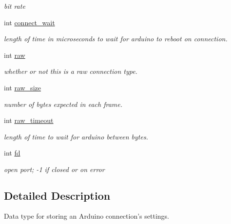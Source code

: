 \begin{DoxyCompactItemize}
\begin{DoxyCompactList}\small\item\em bit rate \end{DoxyCompactList}\item 
int \hyperlink{struct__ino__connection__s_a8735c98900da1fb30ff57141d3271743}{connect\-\_\-wait}
\begin{DoxyCompactList}\small\item\em length of time in microseconds to wait for arduino to reboot on connection. \end{DoxyCompactList}\item 
int \hyperlink{struct__ino__connection__s_afab28b7b3db3a562789bde9c3028bb1f}{raw}
\begin{DoxyCompactList}\small\item\em whether or not this is a raw connection type. \end{DoxyCompactList}\item 
int \hyperlink{struct__ino__connection__s_ab8b6a056a21ce7ad93f913b90db50810}{raw\-\_\-size}
\begin{DoxyCompactList}\small\item\em number of bytes expected in each frame. \end{DoxyCompactList}\item 
int \hyperlink{struct__ino__connection__s_a84d5f96f8956f9a9f24f33ddf1734004}{raw\-\_\-timeout}
\begin{DoxyCompactList}\small\item\em length of time to wait for arduino between bytes. \end{DoxyCompactList}\item 
\hypertarget{struct__ino__connection__s_a0a2e689b7bc4494b879411c0a0a6ec64}{int \hyperlink{struct__ino__connection__s_a0a2e689b7bc4494b879411c0a0a6ec64}{fd}}\label{struct__ino__connection__s_a0a2e689b7bc4494b879411c0a0a6ec64}

\begin{DoxyCompactList}\small\item\em open port; -\/1 if closed or on error \end{DoxyCompactList}\end{DoxyCompactItemize}


\subsection{\-Detailed \-Description}
\-Data type for storing an \-Arduino connection's settings. 

